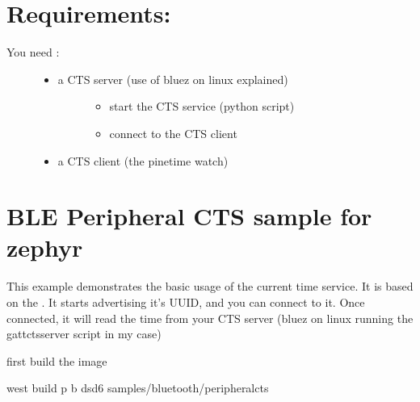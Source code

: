 \documentclass[letterpaper,10pt,english]{sphinxmanual}
\begin{document}
\section{Requirements:}
\label{\detokenize{current-time:requirements}}\begin{description}
\item[{You need :}] \leavevmode\begin{itemize}
\item {} \begin{description}
\item[{a CTS server (use of bluez on linux explained)}] \leavevmode\begin{itemize}
\item {} 
start the CTS service (python script)

\item {} 
connect to the CTS client

\end{itemize}

\end{description}

\item {} 
a CTS client (the pinetime watch)

\end{itemize}

\end{description}


\section{BLE Peripheral CTS sample for zephyr}
\label{\detokenize{current-time:ble-peripheral-cts-sample-for-zephyr}}
This example demonstrates the basic usage of the current time service.
It is based on the .
It starts advertising it’s UUID, and you can connect to it.
Once connected, it will read the time from your CTS server (bluez on linux running the gatt\sphinxhyphen{}cts\sphinxhyphen{}server script in my case)

first build the image

\begin{sphinxVerbatim}[commandchars=\\\{\}]
  west build \PYGZhy{}p \PYGZhy{}b ds\PYGZus{}d6 samples/bluetooth/peripheral\PYGZhy{}cts
\end{sphinxVerbatim}
\end{document}

